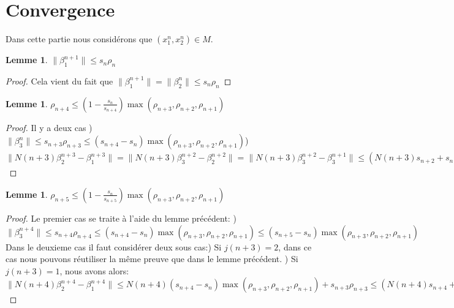 \documentclass[12pt]{article}
\theoremstyle{plain}%
\newtheorem{lem}[thm]{Lemme}
\theoremstyle{definition}
\theoremstyle{remark}
\begin{document}
\section{Convergence}
Dans cette partie nous considérons que $(x_1^n,x_2^n)\in M$.
\begin{lem}
$\|\beta_1^{n+1}\| \leq s_n \rho_n$
\end{lem}
\begin{proof}
Cela vient du fait que $\|\beta_1^{n+1}\|=\| \beta_2^n\| \leq s_n \rho_n$
\end{proof}
\begin{lem}
$\rho_{n+4} \leq (1-\frac{s_n}{s_{n+4}})\max{(\rho_{n+3},\rho_{n+2},\rho_{n+1})}$
\end{lem}
\begin{proof}
Il y a deux cas ) $\| \beta_3^{n} \| \leq s_{n+3} \rho_{n+3} \leq (s_{n+4}-s_n) \max{(\rho_{n+3},\rho_{n+2},\rho_{n+1})} $) $\|N(n+3) \beta_2^{n+3} - \beta_1^{n+3} \| = \|N(n+3) \beta_3^{n+2} - \beta_2^{n+2} \| =\|N(n+3) \beta_3^{n+2} - \beta_3^{n+1} \| \leq (N(n+3)s_{n+2}+s_{n+1})\max{(\rho_{n+3},\rho_{n+2},\rho_{n+1})} \leq (N(n+3)N(n+2)s_{n+2}+N(n+3)s_n+s_{n+1}+s_n)\max{(\rho_{n+3},\rho_{n+2},\rho_{n+1})} \leq (N(n+3)s_n{n+3}+s_{n+1}-s_n)\max{(\rho_{n+3},\rho_{n+2},\rho_{n+1})} \leq (s_{n+4}-s_n)\max{(\rho_{n+3},\rho_{n+2},\rho_{n+1})}$
\end{proof}
\begin{lem}
$\rho_{n+5} \leq (1-\frac{s_n}{s_{n+5}})\max{(\rho_{n+3},\rho_{n+2},\rho_{n+1})}$
\end{lem}
\begin{proof}
Le premier cas se traite à l'aide du lemme précédent: ) $\| \beta_3^{n+4} \| \leq s_{n+4} \rho_{n+4} \leq (s_{n+4}-s_n)\max{(\rho_{n+3},\rho_{n+2},\rho_{n+1})} \leq (s_{n+5}-s_n)\max{(\rho_{n+3},\rho_{n+2},\rho_{n+1})}$ \newline
Dans le deuxieme cas il faut considérer deux sous cas:) Si $j(n+3)=2$, dans ce cas nous pouvons réutiliser la même preuve que dans le lemme précédent. ) Si $j(n+3)=1$, nous avons alors:\newline
$\|N(n+4) \beta_2^{n+4}-\beta_1^{n+4}\| \leq N(n+4)(s_{n+4}-s_n)\max{(\rho_{n+3},\rho_{n+2},\rho_{n+1})} + s_{n+3} \rho_{n+3} \leq (N(n+4)s_{n+4}+s_{n+3}-s_n)\max{(\rho_{n+3},\rho_{n+2},\rho_{n+1})}=(s_{n+5}-s_n)\max{(\rho_{n+3},\rho_{n+2},\rho_{n+1})}$
\end{proof}
\end{document}
